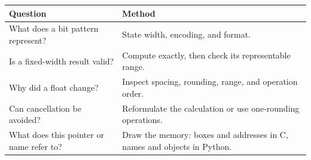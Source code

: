 \documentclass[11pt]{article}
\begin{document}
\begin{keepsection}
\begin{center}\small\begin{tabularx}{\linewidth}{>{\raggedright\arraybackslash}X>{\raggedright\arraybackslash}X}\toprule
\textbf{Question} & \textbf{Method} \\ \midrule
What does a bit pattern represent? & State width, encoding, and format. \\
Is a fixed-width result valid? & Compute exactly, then check its representable range. \\
Why did a float change? & Inspect spacing, rounding, range, and operation order. \\
Can cancellation be avoided? & Reformulate the calculation or use one-rounding operations. \\
What does this pointer or name refer to? & Draw the memory: boxes and addresses in C, names and objects in Python. \\
\bottomrule\end{tabularx}\end{center}
\end{keepsection}
\end{document}
